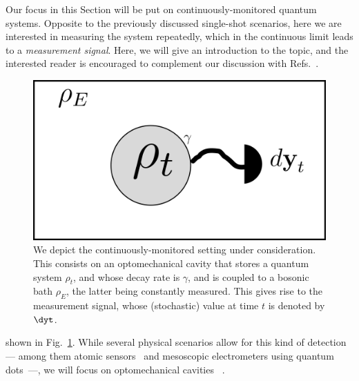 Our focus in this Section will be put on continuously-monitored quantum systems. Opposite to the previously discussed single-shot scenarios, here we are interested in measuring the system repeatedly, which in the continuous limit leads to a \textit{measurement signal}. Here, we will give an introduction to the topic, and the interested reader is encouraged to complement our discussion with Refs.~\cite{wisemanbook,jacobs_2014,gardiner1985input, doherty1999feedback,wiseman1993interpretation}.

\begin{figure}[t!]
    \centering
    \includegraphics[width=1.\textwidth]{Figures/CMON/INTRO/cmon_esquema.png}
    \caption{We depict the continuously-monitored setting under consideration. This consists on an optomechanical cavity that stores a quantum system $\rho_t$, and whose decay rate is $\gamma$, and is coupled to a bosonic bath $\rho_E$, the latter being constantly measured. This gives rise to the measurement signal, whose (stochastic) value at time $t$ is denoted by $\dyt$.}
    \label{fig:cmon_scheme}
\end{figure}



 shown in Fig.~\ref{fig:cmon_scheme}. While several physical scenarios allow for this kind of detection --- among them atomic sensors~\cite{Jimenez2018signal} and mesoscopic electrometers using quantum dots~\cite{Lu2003}---, we will focus on optomechanical cavities~\cite{Aspelmayer2014cavity} .

